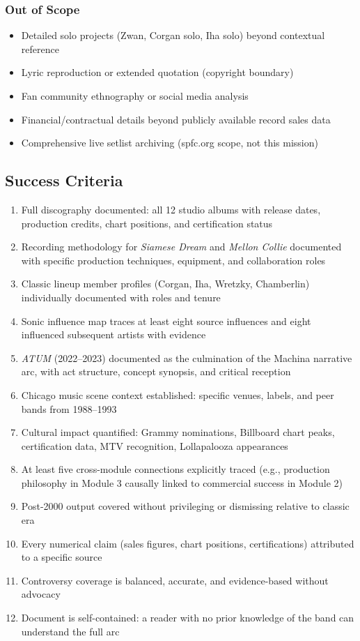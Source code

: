 \documentclass[11pt,letterpaper]{article}
\begin{document}
\subsubsection{Out of Scope}

\begin{itemize}
  \item Detailed solo projects (Zwan, Corgan solo, Iha solo) beyond contextual reference
  \item Lyric reproduction or extended quotation (copyright boundary)
  \item Fan community ethnography or social media analysis
  \item Financial/contractual details beyond publicly available record sales data
  \item Comprehensive live setlist archiving (spfc.org scope, not this mission)
\end{itemize}

\subsection{Success Criteria}

\begin{enumerate}
  \item Full discography documented: all 12 studio albums with release dates, production credits, chart positions, and certification status
  \item Recording methodology for \textit{Siamese Dream} and \textit{Mellon Collie} documented with specific production techniques, equipment, and collaboration roles
  \item Classic lineup member profiles (Corgan, Iha, Wretzky, Chamberlin) individually documented with roles and tenure
  \item Sonic influence map traces at least eight source influences and eight influenced subsequent artists with evidence
  \item \textit{ATUM} (2022--2023) documented as the culmination of the Machina narrative arc, with act structure, concept synopsis, and critical reception
  \item Chicago music scene context established: specific venues, labels, and peer bands from 1988--1993
  \item Cultural impact quantified: Grammy nominations, Billboard chart peaks, certification data, MTV recognition, Lollapalooza appearances
  \item At least five cross-module connections explicitly traced (e.g., production philosophy in Module 3 causally linked to commercial success in Module 2)
  \item Post-2000 output covered without privileging or dismissing relative to classic era
  \item Every numerical claim (sales figures, chart positions, certifications) attributed to a specific source
  \item Controversy coverage is balanced, accurate, and evidence-based without advocacy
  \item Document is self-contained: a reader with no prior knowledge of the band can understand the full arc
\end{enumerate}
\end{document}
